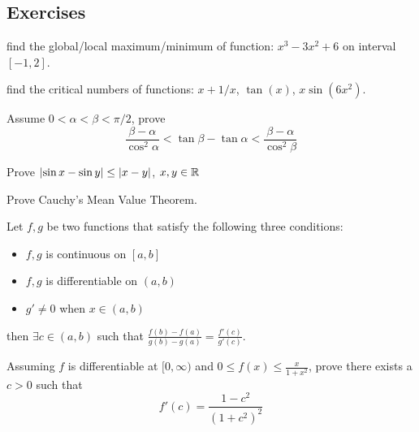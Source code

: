 \documentclass[Calculus 1 Recitation.tex]{subfiles}
\begin{document}
\subsection{Exercises}

\begin{myleftlinebox}
	find the global/local maximum/minimum of function: $x^3-3x^2+6$ on interval $[-1,2]$.
	\tcblower
	\vspace{2em}	
\end{myleftlinebox}

\begin{myleftlinebox}
	find the critical numbers of functions: $x+1/x$, $\tan(x)$, $x\sin(6x^2)$.
	\tcblower
	\vspace{2em}	
\end{myleftlinebox}

\begin{myleftlinebox}
	Assume $0<\alpha<\beta<\pi/2$, prove 
	\[\frac{\beta-\alpha}{\cos^2\alpha}<\tan\beta-\tan\alpha<\frac{\beta-\alpha}{\cos^2\beta}\]
	\tcblower
	\vspace{2em}	
\end{myleftlinebox}

\begin{myleftlinebox}
	Prove $\left\vert\sin x-\sin y\right\vert \leq \left\vert x-y\right\vert$, $x,y\in\mathbb{R}$
	\tcblower
	\vspace{2em}	
\end{myleftlinebox}

\begin{myleftlinebox}
	Prove Cauchy's Mean Value Theorem. 
	\begin{theorem}
		Let $f,g$ be two functions that satisfy the following three conditions:
		\begin{itemize}
			\item $f,g$ is continuous on $[a,b]$
			\item $f,g$ is differentiable on $(a,b)$
			\item $g'\neq0$ when $x\in(a,b)$
		\end{itemize}
		then $\exists c\in(a,b)$ such that $\frac{f(b)-f(a)}{g(b)-g(a)}=\frac{f'(c)}{g'(c)}$.
	\end{theorem}
	\tcblower
	\vspace{2em}	
\end{myleftlinebox}

\begin{myleftlinebox}
	Assuming $f$ is differentiable at $[0,\infty)$ and $0\leq f(x)\leq \frac{x}{1+x^2}$, prove there exists a $c>0$ such that
	\[f'(c)=\frac{1-c^2}{(1+c^2)^2}\]
	\tcblower
	\vspace{2em}
\end{myleftlinebox}
\end{document}
